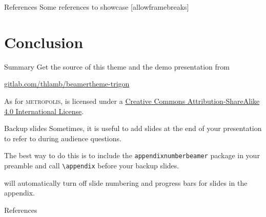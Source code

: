 \begin{frame}{References}
  Some references to showcase [allowframebreaks] \cite{knuth92,ConcreteMath,Simpson,Er01,greenwade93}
\end{frame}

\section{Conclusion}

\begin{frame}{Summary}
  Get the source of this theme and the demo presentation from

  \begin{center}
    \url{gitlab.com/thlamb/beamertheme-trigon}
  \end{center}

  As for \textsc{metropolis}, \themename is licensed under a
  \href{http://creativecommons.org/licenses/by-sa/4.0/}{Creative Commons
  Attribution-ShareAlike 4.0 International License}.

  \begin{center}\ccbysa\end{center}
\end{frame}

\appendix

\begin{frame}[fragile]{Backup slides}
  Sometimes, it is useful to add slides at the end of your presentation to
  refer to during audience questions.

  The best way to do this is to include the \verb|appendixnumberbeamer|
  package in your preamble and call \verb|\appendix| before your backup slides.

  \themename will automatically turn off slide numbering and progress bars for
  slides in the appendix.
\end{frame}

\begin{frame}[allowframebreaks]{References}
  
  
\end{frame}
